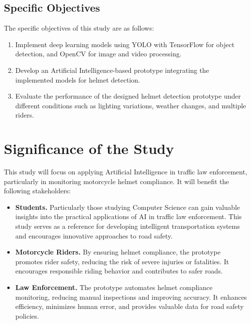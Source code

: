 \begin{refsection}
\subsection{Specific Objectives}


The specific objectives of this study are as follows:


\begin{enumerate}
    \item Implement deep learning models using YOLO with TensorFlow for object detection, and OpenCV for image and video processing.
    \item Develop an Artificial Intelligence-based prototype integrating the implemented models for helmet detection.
    \item Evaluate the performance of the designed helmet detection prototype under different conditions such as lighting variations, weather changes, and multiple riders.  
\end{enumerate}
   


\section{Significance of the Study}


This study will focus on applying Artificial Intelligence in traffic law enforcement, particularly in monitoring motorcycle helmet compliance. It will benefit the following stakeholders:


\begin{itemize}
    \item \textbf{Students.} Particularly those studying Computer Science can gain valuable insights into the practical applications of AI in traffic law enforcement. This study serves as a reference for developing intelligent transportation systems and encourages innovative approaches to road safety.
   
    \item \textbf{Motorcycle Riders.} By ensuring helmet compliance, the prototype promotes rider safety, reducing the risk of severe injuries or fatalities. It encourages responsible riding behavior and contributes to safer roads.
   
    \item \textbf{Law Enforcement.} The prototype automates helmet compliance monitoring, reducing manual inspections and improving accuracy. It enhances efficiency, minimizes human error, and provides valuable data for road safety policies.
   

\end{itemize}
\end{refsection}
